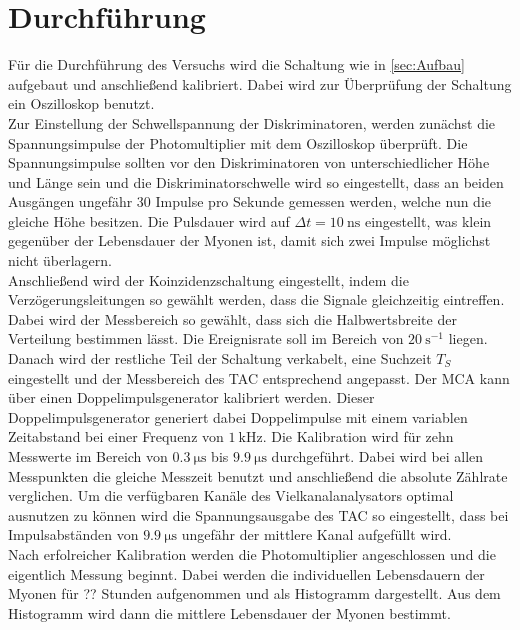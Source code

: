 \section{Durchführung}
\label{sec:Durchführung}
Für die Durchführung des Versuchs wird die Schaltung wie in \autoref{sec:Aufbau} aufgebaut und  anschließend kalibriert.
Dabei wird zur Überprüfung der Schaltung ein Oszilloskop benutzt.\\
Zur Einstellung der Schwellspannung der Diskriminatoren, werden zunächst die Spannungsimpulse der Photomultiplier mit dem Oszilloskop überprüft.
Die Spannungsimpulse sollten vor den Diskriminatoren von unterschiedlicher Höhe und Länge sein und die Diskriminatorschwelle wird so eingestellt,
dass an beiden Ausgängen ungefähr $30$ Impulse pro Sekunde gemessen werden, welche nun die gleiche Höhe besitzen.
Die Pulsdauer wird auf $\Delta t = \qty{10}{\nano\second}$ eingestellt, was klein gegenüber der Lebensdauer der Myonen ist, damit sich zwei Impulse
möglichst nicht überlagern.\\
Anschließend wird der Koinzidenzschaltung eingestellt, indem die Verzögerungsleitungen so gewählt werden, dass die Signale gleichzeitig eintreffen. Dabei wird der Messbereich so gewählt,
dass sich die Halbwertsbreite der Verteilung bestimmen lässt. Die Ereignisrate soll im Bereich von $\qty{20}{\second^{-1}}$ liegen.\\
Danach wird der restliche Teil der Schaltung verkabelt, eine Suchzeit $T_S$ eingestellt und der Messbereich des TAC entsprechend angepasst.
Der MCA kann über einen Doppelimpulsgenerator kalibriert werden. Dieser Doppelimpulsgenerator generiert dabei Doppelimpulse mit einem
variablen Zeitabstand bei einer Frequenz von $\qty{1}{\kilo\Hz}$. Die Kalibration wird für zehn Messwerte im Bereich von
$\qty{0.3}{\micro\second}$ bis $\qty{9.9}{\micro\second}$ durchgeführt. Dabei wird bei allen Messpunkten die gleiche Messzeit benutzt
und anschließend die absolute Zählrate verglichen.
Um die verfügbaren Kanäle des Vielkanalanalysators optimal ausnutzen zu können wird die Spannungsausgabe des
TAC so eingestellt, dass bei Impulsabständen von $\qty{9.9}{\micro\second}$ ungefähr der mittlere Kanal
aufgefüllt wird.\\
Nach erfolreicher Kalibration werden die Photomultiplier angeschlossen und die eigentlich Messung beginnt.
Dabei werden die individuellen Lebensdauern der Myonen für ?? Stunden aufgenommen und als Histogramm dargestellt.
Aus dem Histogramm wird dann die mittlere Lebensdauer der Myonen bestimmt.


